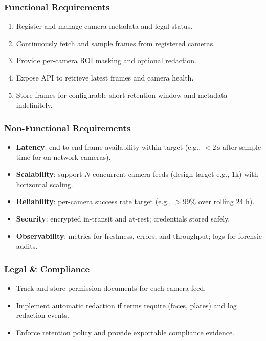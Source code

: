 \subsubsection{Functional Requirements}
\begin{enumerate}
  \item Register and manage camera metadata and legal status.
  \item Continuously fetch and sample frames from registered cameras.
  \item Provide per-camera ROI masking and optional redaction.
  \item Expose API to retrieve latest frames and camera health.
  \item Store frames for configurable short retention window and metadata indefinitely.
\end{enumerate}

\subsubsection{Non-Functional Requirements}
\begin{itemize}
  \item \textbf{Latency}: end-to-end frame availability within target (e.g., $<2\,\text{s}$ after sample time for on-network cameras).
  \item \textbf{Scalability}: support $N$ concurrent camera feeds (design target e.g., 1k) with horizontal scaling.
  \item \textbf{Reliability}: per-camera success rate target (e.g., $>99\%$ over rolling 24 h).
  \item \textbf{Security}: encrypted in-transit and at-rest; credentials stored safely.
  \item \textbf{Observability}: metrics for freshness, errors, and throughput; logs for forensic audits.
\end{itemize}

\subsubsection{Legal \& Compliance}
\begin{itemize}
  \item Track and store permission documents for each camera feed.
  \item Implement automatic redaction if terms require (faces, plates) and log redaction events.
  \item Enforce retention policy and provide exportable compliance evidence.
\end{itemize}

